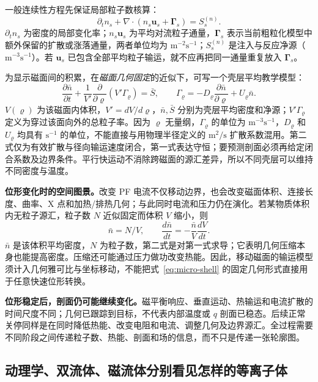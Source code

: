 \documentclass[12pt,fontset=none]{ctexart}
\numberwithin{equation}{section}
\numberwithin{table}{section}
\numberwithin{figure}{section}
\begin{document}
一般连续性方程先保证局部粒子数核算：
\begin{equation}\label{eq:micro-continuity}
 \partial_t n_s+\nabla\cdot(n_s\bm u_s+\bm\Gamma_s)=S_s^{(n)}.
\end{equation}
$\partial_t n_s$ 为密度的局部变化率；$n_s\bm u_s$ 为平均对流粒子通量，$\bm\Gamma_s$ 表示当前粗粒化模型中额外保留的扩散或涨落通量，两者单位均为 $\mathrm{m^{-2}s^{-1}}$；$S_s^{(n)}$ 是注入与反应净源（$\mathrm{m^{-3}s^{-1}}$）。若 $\bm u_s$ 已包含全部平均粒子输运，就不应再把同一通量重复放入 $\bm\Gamma_s$。

为显示磁面间的积累，在\emph{磁面几何固定}的近似下，可写一个壳层平均教学模型：
\begin{equation}\label{eq:micro-shell}
 \frac{\partial\bar n}{\partial t}
 +\frac1{V'}\frac{\partial}{\partial\varrho}(V'\Gamma_{\varrho})
 =\bar S,
 \qquad \Gamma_{\varrho}=-D_{\varrho}\frac{\partial\bar n}{\partial\varrho}
 +U_{\varrho}\bar n.
\end{equation}
$V(\varrho)$ 为该磁面内体积，$V'=dV/d\varrho$，$\bar n,\bar S$ 分别为壳层平均密度和净源；$V'\Gamma_{\varrho}$ 定义为穿过该面向外的总粒子率。因为 $\varrho$ 无量纲，$\Gamma_{\varrho}$ 的单位为 $\mathrm{m^{-3}s^{-1}}$，$D_{\varrho}$ 和 $U_{\varrho}$ 均具有 $\mathrm{s^{-1}}$ 的单位，不能直接与用物理半径定义的 $\mathrm{m^2/s}$ 扩散系数混用。第二式仅为有效扩散与径向输运速度闭合，第一式表达守恒；要预测剖面必须再给定闭合系数及边界条件。平行快运动不消除跨磁面的源汇差异，所以不同壳层可以维持不同密度与温度。

\textbf{位形变化时的空间图景。}改变 PF 电流不仅移动边界，也会改变磁面体积、连接长度、曲率、X 点和加热/排热几何；与此同时电流和压力仍在演化。若某物质体积内无粒子源汇，粒子数 $N$ 近似固定而体积 $V$ 缩小，则
\begin{equation}\label{eq:micro-compression}
 \bar n=N/V,\qquad \frac{d\bar n}{dt}=-\frac{\bar n}{V}\frac{dV}{dt}.
\end{equation}
$\bar n$ 是该体积平均密度，$N$ 为粒子数，第二式是对第一式求导；它表明几何压缩本身也能提高密度。压缩还可能通过压力做功改变热能。因此，移动磁面的输运模型须计入几何雅可比与坐标移动，不能把式~\eqref{eq:micro-shell} 的固定几何形式直接用于任意快速位形转换。

\textbf{位形稳定后，剖面仍可能继续变化。}磁平衡响应、垂直运动、热输运和电流扩散的时间尺度不同；几何已跟踪到目标，不代表内部温度或 $q$ 剖面已稳态。后续正常关停同样是在同时降低热能、改变电阻和电流、调整几何及边界源汇。全过程需要不同阶段之间传递粒子数、热能、剖面和场的信息，而不只是传递一张轮廓图。

\subsection{动理学、双流体、磁流体分别看见怎样的等离子体}\label{sec:micro-models}
\end{document}
